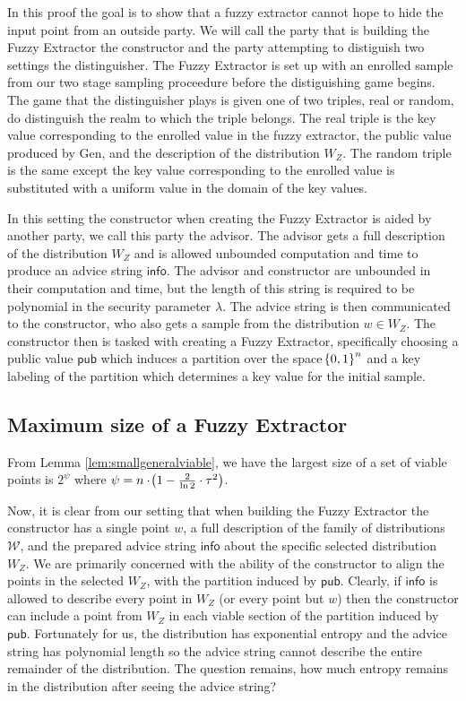 In this proof the goal is to show that a fuzzy extractor cannot hope to hide the input point from an outside party. 
We will call the party that is building the Fuzzy Extractor the constructor and the party attempting to distiguish two settings the distinguisher. 
The Fuzzy Extractor is set up with an enrolled sample from our two stage sampling proceedure before the distiguishing game begins.
The game that the distinguisher plays is given one of two triples, real or random, do distinguish the realm to which the triple belongs. 
The real triple is the key value corresponding to the enrolled value in the fuzzy extractor, the public value produced by Gen, and the description of the distribution $W_Z$.
The random triple is the same except the key value corresponding to the enrolled value is substituted with a uniform value in the domain of the key values.

In this setting the constructor when creating the Fuzzy Extractor is aided by another party, we call this party the advisor. 
The advisor gets a full description of the distribution $W_Z$ and is allowed unbounded computation and time to produce an advice string $\mathsf{info}$. 
The advisor and constructor are unbounded in their computation and time, but the length of this string is required to be polynomial in the security parameter $\lambda$. 
The advice string is then communicated to the constructor, who also gets a sample from the distribution $w \in W_Z$. 
The constructor then is tasked with creating a Fuzzy Extractor, specifically choosing a public value $\mathsf{pub}$ which induces a partition over the space $\!\left\{ 0,1 \right\}^{n}$ and a key labeling of the partition which determines a key value for the initial sample.

\subsection{Maximum size of a Fuzzy Extractor}
From Lemma \ref{lem:smallgeneralviable}, we have the largest size of a set of viable points is $2^{\psi}$ where $\psi = n \cdot \!\left(1 - \frac{2}{\ln{2}} \cdot \tau^{2}\right)$.

Now, it is clear from our setting that when building the Fuzzy Extractor the constructor has a single point $w$, a full description of the family of distributions $\mathcal{W}$, and the prepared advice string $\mathsf{info}$ about the specific selected distribution $W_Z$. 
We are primarily concerned with the ability of the constructor to align the points in the selected $W_Z$, with the partition induced by $\mathsf{pub}$. 
Clearly, if $\mathsf{info}$ is allowed to describe every point in $W_Z$ (or every point but $w$) then the constructor can include a point from $W_Z$ in each viable section of the partition induced by $\mathsf{pub}$. 
Fortunately for us, the distribution has exponential entropy and the advice string has polynomial length so the advice string cannot describe the entire remainder of the distribution. 
The question remains, how much entropy remains in the distribution after seeing the advice string? 

